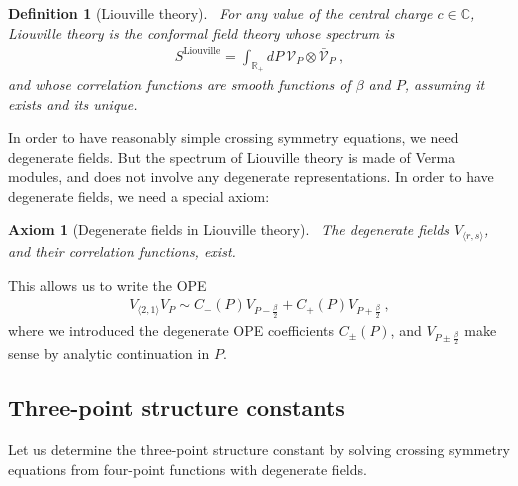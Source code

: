\documentclass[12pt, a4paper]{article}
\theoremstyle{break}
\newtheorem{hyp}[exo]{Axiom}
\newtheorem{defn}[exo]{Definition}
\begin{document}
\begin{defn}[Liouville theory]
 ~\label{def:liou}
 For any value of the central charge $c\in\mathbb{C}$, Liouville theory is the conformal field theory whose spectrum is 
 \begin{align}
  S^\mathrm{Liouville} 
= \int_{\mathbb{R}_+}  dP\ \mathcal V_P \otimes 
   \bar{\mathcal V}_P\ , 
   \label{eq:sl}
 \end{align}
and whose correlation functions are smooth functions of $\beta$ and $P$, assuming it exists and its unique.
\end{defn}

In order to have reasonably simple crossing symmetry equations, we need degenerate fields. 
But the spectrum of Liouville theory is made of Verma modules, and does not involve any degenerate representations.
In order to have degenerate fields, we need a special axiom:

\begin{hyp}[Degenerate fields in Liouville theory]
 ~\label{hyp:degl}
 The degenerate fields $V_{\langle r, s\rangle}$, and their correlation functions, exist. 
\end{hyp}
This allows us to write the OPE
\begin{align}
 V_{\langle 2, 1\rangle} V_P \sim C_-(P) V_{P-\frac{\beta}{2}} + C_+(P)V_{P +\frac{\beta}{2}}\ ,
 \label{degope}
\end{align}
where we introduced the degenerate OPE coefficients $C_\pm(P)$, and $V_{P\pm \frac{\beta}{2}}$ make sense by analytic continuation in $P$.


\subsection{Three-point structure constants}\label{sec:sol}

Let us determine the three-point structure constant by solving crossing symmetry equations from four-point functions with degenerate fields. 
\end{document}
